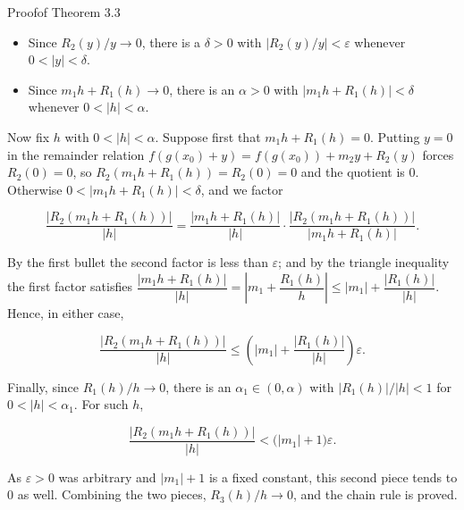 \documentclass[a4paper,12pt,oneside]{memoir}
\begin{document}
\begin{envproof}{Proof}{}{of Theorem 3.3}
\begin{itemize}
  \item Since \(R_{2}(y)/y \to 0\), there is a \(\delta > 0\) with \(\left\lvert R_{2}(y)/y \right\rvert < \varepsilon\) whenever \(0 < \lvert y \rvert < \delta\).
  \item Since \(m_{1} h + R_{1}(h) \to 0\), there is an \(\alpha > 0\) with \(\lvert m_{1} h + R_{1}(h) \rvert < \delta\) whenever \(0 < \lvert h \rvert < \alpha\).
\end{itemize}
Now fix \(h\) with \(0 < \lvert h \rvert < \alpha\). Suppose first that \(m_{1} h + R_{1}(h) = 0\). Putting \(y = 0\) in the remainder relation \(f(g(x_{0}) + y) = f(g(x_{0})) + m_{2} y + R_{2}(y)\) forces \(R_{2}(0) = 0\), so \(R_{2}(m_{1} h + R_{1}(h)) = R_{2}(0) = 0\) and the quotient is \(0\). Otherwise \(0 < \lvert m_{1} h + R_{1}(h) \rvert < \delta\), and we factor

\[ \frac{\lvert R_{2}(m_{1} h + R_{1}(h)) \rvert}{\lvert h \rvert} = \frac{\lvert m_{1} h + R_{1}(h) \rvert}{\lvert h \rvert} \cdot \frac{\lvert R_{2}(m_{1} h + R_{1}(h)) \rvert}{\lvert m_{1} h + R_{1}(h) \rvert}. \]

By the first bullet the second factor is less than \(\varepsilon\); and by the triangle inequality the first factor satisfies \(\dfrac{\lvert m_{1} h + R_{1}(h) \rvert}{\lvert h \rvert} = \left\lvert m_{1} + \dfrac{R_{1}(h)}{h} \right\rvert \le \lvert m_{1} \rvert + \dfrac{\lvert R_{1}(h) \rvert}{\lvert h \rvert}\). Hence, in either case,

\[ \frac{\lvert R_{2}(m_{1} h + R_{1}(h)) \rvert}{\lvert h \rvert} \le \left( \lvert m_{1} \rvert + \frac{\lvert R_{1}(h) \rvert}{\lvert h \rvert} \right)\varepsilon. \]

Finally, since \(R_{1}(h)/h \to 0\), there is an \(\alpha_{1} \in (0, \alpha)\) with \(\lvert R_{1}(h) \rvert/\lvert h \rvert < 1\) for \(0 < \lvert h \rvert < \alpha_{1}\). For such \(h\),

\[ \frac{\lvert R_{2}(m_{1} h + R_{1}(h)) \rvert}{\lvert h \rvert} < \bigl( \lvert m_{1} \rvert + 1 \bigr)\varepsilon. \]

As \(\varepsilon > 0\) was arbitrary and \(\lvert m_{1} \rvert + 1\) is a fixed constant, this second piece tends to \(0\) as well. Combining the two pieces, \(R_{3}(h)/h \to 0\), and the chain rule is proved.
\end{envproof}
\end{document}

